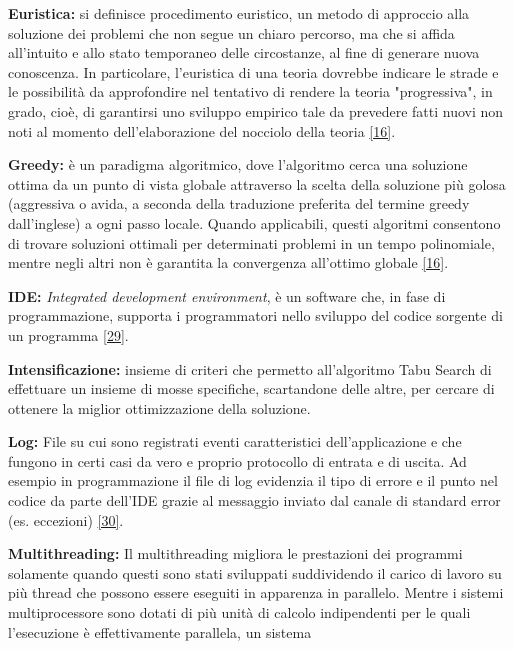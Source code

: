 \begin{description}
     \item \label{Euristica} \textbf{Euristica:} si definisce procedimento euristico, un metodo di approccio alla soluzione dei problemi che non segue un chiaro percorso,
     ma che si affida all'intuito e allo stato temporaneo delle circostanze, al fine di generare nuova conoscenza. In particolare, l'euristica di una teoria dovrebbe indicare
    le strade e le possibilità da approfondire nel tentativo di rendere la teoria "progressiva", in grado, cioè, di garantirsi uno sviluppo empirico tale da prevedere fatti
    nuovi non noti al momento dell'elaborazione del nocciolo della teoria \hyperref[slide]{[16]}.
    \item \label{Greedy} \textbf{Greedy:} è un paradigma algoritmico, dove l'algoritmo cerca una soluzione ottima da un punto di vista globale attraverso la
     scelta della soluzione più golosa (aggressiva o avida, a seconda della traduzione preferita del termine greedy dall'inglese) a ogni passo locale. 
     Quando applicabili, questi algoritmi consentono di trovare soluzioni ottimali per determinati problemi in un tempo polinomiale, mentre negli altri non 
     è garantita la convergenza all'ottimo globale \hyperref[slide]{[16]}.
    \item \label{IDE} \textbf{IDE:} \textit{Integrated development environment}, è un software che, in fase di programmazione, supporta i programmatori nello sviluppo del codice sorgente di un programma \hyperref[ide]{[29]}.
    \item \label{Intensificazione} \textbf{Intensificazione:} insieme di criteri che permetto all'algoritmo Tabu Search di effettuare un insieme di mosse specifiche, scartandone delle
    altre, per cercare di ottenere la miglior ottimizzazione della soluzione.
    \item \label{Log} \textbf{Log:} File su cui sono registrati eventi caratteristici dell’applicazione e che fungono
    in certi casi da vero e proprio protocollo di entrata e di uscita. Ad esempio in
    programmazione il file di log evidenzia il tipo di errore e il punto nel codice
    da parte dell’IDE grazie al messaggio inviato dal canale di standard error (es. eccezioni) \hyperref[log]{[30]}.
    \item \label{Multithreading} \textbf{Multithreading:} Il multithreading migliora le prestazioni dei programmi solamente quando questi sono stati sviluppati suddividendo il carico di lavoro su più thread
     che possono essere eseguiti in apparenza in parallelo. Mentre i sistemi multiprocessore sono dotati di più unità di calcolo indipendenti per le quali l'esecuzione è effettivamente parallela, un sistema

\end{description}
